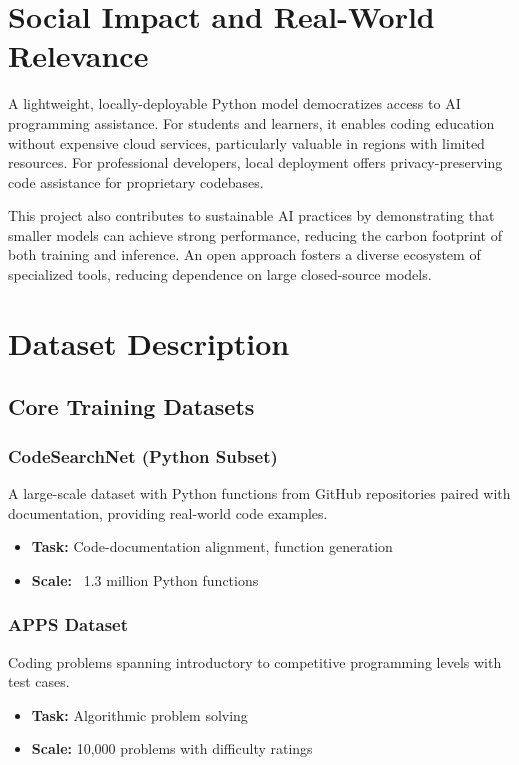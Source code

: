 \documentclass[preprint,12pt]{elsarticle}
\begin{document}
\section{Social Impact and Real-World Relevance}

A lightweight, locally-deployable Python model democratizes access to AI programming assistance. For students and learners, it enables coding education without expensive cloud services, particularly valuable in regions with limited resources. For professional developers, local deployment offers privacy-preserving code assistance for proprietary codebases.

This project also contributes to sustainable AI practices by demonstrating that smaller models can achieve strong performance, reducing the carbon footprint of both training and inference. An open approach fosters a diverse ecosystem of specialized tools, reducing dependence on large closed-source models.

\section{Dataset Description}

\subsection{Core Training Datasets}

\subsubsection{CodeSearchNet (Python Subset)}
A large-scale dataset with Python functions from GitHub repositories paired with documentation, providing real-world code examples.
\begin{itemize}
\item \textbf{Task:} Code-documentation alignment, function generation
\item \textbf{Scale:} ~1.3 million Python functions
\end{itemize}

\subsubsection{APPS Dataset}
Coding problems spanning introductory to competitive programming levels with test cases.
\begin{itemize}
\item \textbf{Task:} Algorithmic problem solving
\item \textbf{Scale:} 10,000 problems with difficulty ratings
\end{itemize}
\end{document}
